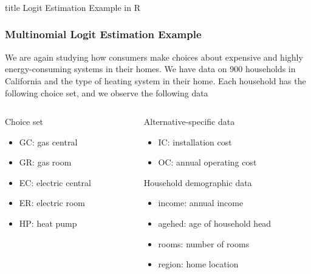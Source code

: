 \documentclass{beamer}\usepackage[]{graphicx}\usepackage[]{color}
\begin{document}
\begin{frame}\frametitle{}
    \vfill
    \centering
    \begin{beamercolorbox}[center]{title}
        \Large Logit Estimation Example in R
    \end{beamercolorbox}
    \vfill
\end{frame}

\begin{frame}\frametitle{Multinomial Logit Estimation Example}
    We are again studying how consumers make choices about expensive and highly energy-consuming systems in their homes. We have data on 900 households in California and the type of heating system in their home. Each household has the following choice set, and we observe the following data \\
    \vspace{3ex}
    \begin{columns}
    	\begin{column}{0.5\textwidth}
		    Choice set
		    \begin{itemize}
		    	\item GC: gas central
		    	\item GR: gas room
		    	\item EC: electric central
		    	\item ER: electric room
		    	\item HP: heat pump
		    \end{itemize}
		    \vspace{8ex}
	    \end{column}
	    \begin{column}{0.5\textwidth}
		    Alternative-specific data
		    \begin{itemize}
		    	\item IC: installation cost
		    	\item OC: annual operating cost
		    \end{itemize}
		    \vspace{2ex}
		    Household demographic data
		    \begin{itemize}
		    	\item income: annual income
		    	\item agehed: age of household head
		    	\item rooms: number of rooms
                \item region: home location
		    \end{itemize}
		\end{column}
    \end{columns}
\end{frame}
\end{document}
